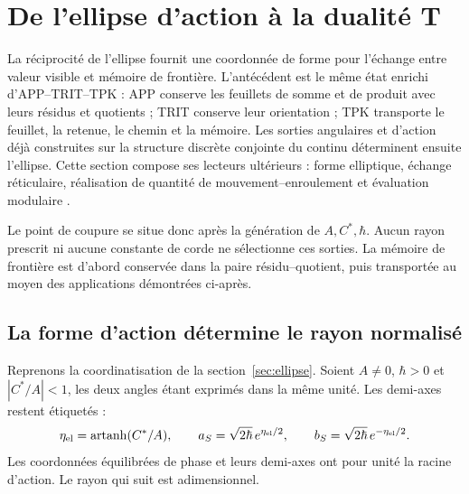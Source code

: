 
\section{De l’ellipse d’action à la dualité T}
\label{sec:ii-dualidad-t}

La réciprocité de l’ellipse fournit une coordonnée de forme pour
l’échange entre valeur visible et mémoire de frontière. L’antécédent est le
même état enrichi d’APP--TRIT--TPK : APP conserve les feuillets de
somme et de produit avec leurs résidus et quotients ; TRIT conserve leur orientation ;
TPK transporte le feuillet, la retenue, le chemin et la mémoire. Les sorties angulaires et
d’action déjà construites sur la structure discrète conjointe du continu
déterminent ensuite l’ellipse. Cette section compose ses lecteurs ultérieurs :
forme elliptique, échange réticulaire, réalisation de quantité de mouvement--enroulement
et évaluation modulaire \cite{elipse,hmtedicionintegral}.

Le point de coupure se situe donc après la génération de
\(A,C^*,\hbar\). Aucun rayon prescrit ni aucune constante de corde ne sélectionne
ces sorties. La mémoire de frontière est d’abord conservée dans la paire
résidu--quotient, puis transportée au moyen des applications démontrées
ci-après.

\subsection{La forme d’action détermine le rayon normalisé}

Reprenons la coordinatisation de la section~\ref{sec:ellipse}. Soient \(A\ne0\),
\(\hbar>0\) et \(|C^*/A|<1\), les deux angles étant exprimés dans la même
unité. Les demi-axes restent étiquetés :
\begin{equation}
 \eta_{\rm el}=\operatorname{artanh}(C^*/A),\qquad
 a_S=\sqrt{2\hbar}\,e^{\eta_{\rm el}/2},\qquad
 b_S=\sqrt{2\hbar}\,e^{-\eta_{\rm el}/2}.
 \label{eq:ii-t-elipse}
\end{equation}
Les coordonnées équilibrées de phase et leurs demi-axes ont pour unité la racine
d’action. Le rayon qui suit est adimensionnel.

